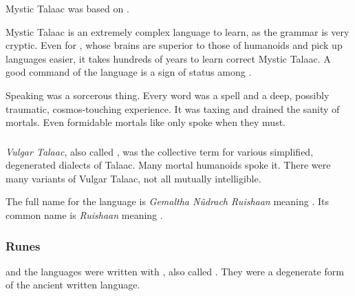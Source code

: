 Mystic Talaac was based on . 

Mystic Talaac is an extremely complex language to learn, as the grammar is very cryptic. 
Even for \dragons{}, whose brains are superior to those of humanoids and pick up languages easier, it takes hundreds of years to learn correct Mystic Talaac. 
A good command of the language is a sign of status among \dragons{}. 

Speaking \TrueDraconic was a sorcerous thing. 
Every word was a spell and a deep, possibly traumatic, cosmos-touching experience.
It was taxing and drained the sanity of mortals. 
Even formidable mortals like \Criseis only spoke \TrueDraconic when they must.






\subsubsection{\CommonDraconic}
\emph{Vulgar Talaac}, also called \emph{\CommonDraconic}, was the collective term for various simplified, degenerated dialects of Talaac. 
Many mortal humanoids spoke it.
There were many variants of Vulgar Talaac, not all mutually intelligible. 

The full name for the language is \emph{Gemaltha N\^udrach Ruishaan} meaning .
Its common name is \emph{Ruishaan} meaning .





\subsubsection{Runes}
\Draconic and the \quiljaaran languages were written with , also called .
They were a degenerate form of the ancient \ophidian written language.

